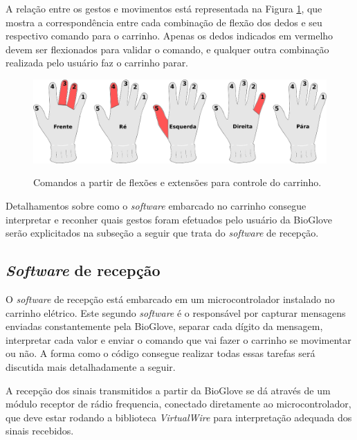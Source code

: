 \documentclass[
	12pt,				%
	openright,			%
	oneside,			%
	a4paper,			%
	english,			%
	brazil				%
	]{abntex2}
\begin{document}
		A relação entre os gestos e movimentos está representada na Figura \ref{Fig:glove-control-positions1}, que mostra a correspondência entre cada combinação de flexão dos dedos e seu respectivo comando para o carrinho. Apenas os dedos indicados em vermelho devem ser flexionados para validar o comando, e qualquer outra combinação realizada pelo usuário faz o carrinho parar.


		\begin{figure}[h!]
			\centering
			\caption{Comandos a partir de flexões e extensões para controle do carrinho.}
  		\includegraphics[width=14cm]{./figures/glove-control-positions1.png}
  		\label{Fig:glove-control-positions1}
		\end{figure}

		Detalhamentos sobre como o \textit{software} embarcado no carrinho consegue interpretar e reconher quais gestos foram efetuados pelo usuário da BioGlove serão explicitados na subseção a seguir que trata do \textit{software} de recepção.	

		
		\subsection{\textit{Software} de recepção}


		 O \textit{software} de recepção está embarcado em um microcontrolador instalado no carrinho elétrico. Este segundo \textit{software} é o responsável por capturar mensagens enviadas constantemente pela BioGlove, separar cada dígito da mensagem, interpretar cada valor e enviar o comando que vai fazer o carrinho se movimentar ou não. A forma como o código consegue realizar todas essas tarefas será discutida mais detalhadamente a seguir.
		
		A recepção dos sinais transmitidos a partir da BioGlove se dá através de um módulo receptor de rádio frequencia, conectado diretamente ao microcontrolador, que deve estar rodando a biblioteca \textit{VirtualWire} para interpretação adequada dos sinais recebidos.
\end{document}
